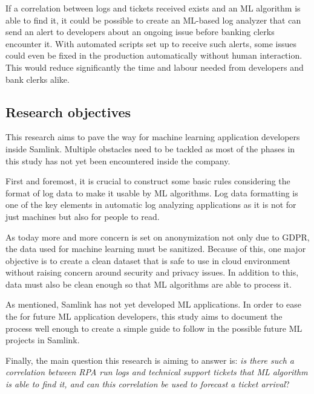 If a correlation between logs and tickets received exists
and an ML algorithm is able to find it,
it could be possible to create an ML-based log analyzer
that can send an alert to developers
about an ongoing issue before banking clerks encounter it.
With automated scripts set up to receive such alerts,
some issues could even be fixed in the production
automatically without human interaction.
This would reduce significantly the time and labour needed
from developers and bank clerks alike. %


\subsection{Research objectives}\label{subsec:intro-research-objectives}
This research aims to
pave the way for machine learning application developers
inside Samlink.
Multiple obstacles need to be tackled
as most of the phases in this study
has not yet been encountered inside the company.

First and foremost,
it is crucial to construct some basic rules
considering the format of log data
to make it usable by ML algorithms.
Log data formatting
is one of the key elements in automatic log analyzing applications
as it is not for just machines
but also for people to read.

As today more and more concern is set on anonymization
not only due to GDPR,
the data used for machine learning must be sanitized.
Because of this,
one major objective is to create a clean dataset
that is safe to use in cloud environment
without raising concern around security and privacy issues.
In addition to this,
data must also be clean enough
so that ML algorithms
are able to process it.

As mentioned,
Samlink has not yet developed ML applications.
In order to ease the %
for future ML application developers,
this study aims to document the process %
well enough to create a simple guide to follow
in the possible future ML projects in Samlink.

Finally,
the main question this research is aiming to answer is:
\textit{is there such a correlation between RPA run logs and technical support tickets
that ML algorithm is able to find it,
and can this correlation be used to forecast a ticket arrival}?


